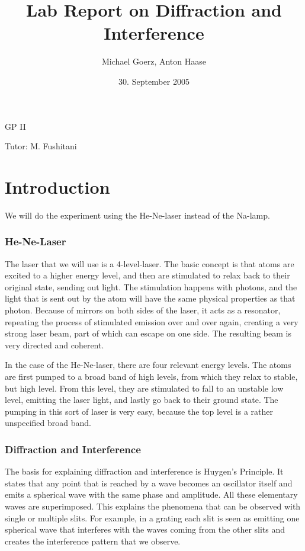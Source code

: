 \documentclass[a4paper,10pt]{article}
\title{Lab Report on Diffraction and Interference}
\author{Michael Goerz, Anton Haase}
\date{30. September 2005}
\begin{document}
\maketitle
\noindent GP II

\noindent Tutor: M. Fushitani

\section{Introduction}
We will do the experiment using the He-Ne-laser instead of the Na-lamp.
\subsubsection*{He-Ne-Laser}
The laser that we will use is a 4-level-laser. The basic concept is that atoms are excited to a higher energy level, and then are stimulated to relax back to their original state, sending out light. The stimulation happens with photons, and the light that is sent out by the atom will have the same physical properties as that photon. Because of mirrors on both sides of the laser, it acts as a resonator, repeating the process of stimulated emission over and over again, creating a very strong laser beam, part of which can escape on one side. The resulting beam is very directed and coherent.

In the case of the He-Ne-laser, there are four relevant energy levels. The atoms are first pumped to a broad band of high levels, from which they relax to stable, but high level. From this level, they are stimulated to fall to an unstable low level, emitting the laser light, and lastly go back to their ground state. The pumping in this sort of laser is very easy, because the top level is a rather unspecified broad band.

\subsubsection*{Diffraction and Interference}
The basis for explaining diffraction and interference is Huygen's Principle. It states that any point that is reached by a wave becomes an oscillator itself and emits a spherical wave with the same phase and amplitude. All these elementary waves are superimposed. This explains the phenomena that can be observed with single or multiple slits. For example, in a grating each slit is seen as emitting one spherical wave that interferes with the waves coming from the other slits and creates the interference pattern that we observe.
\end{document}
